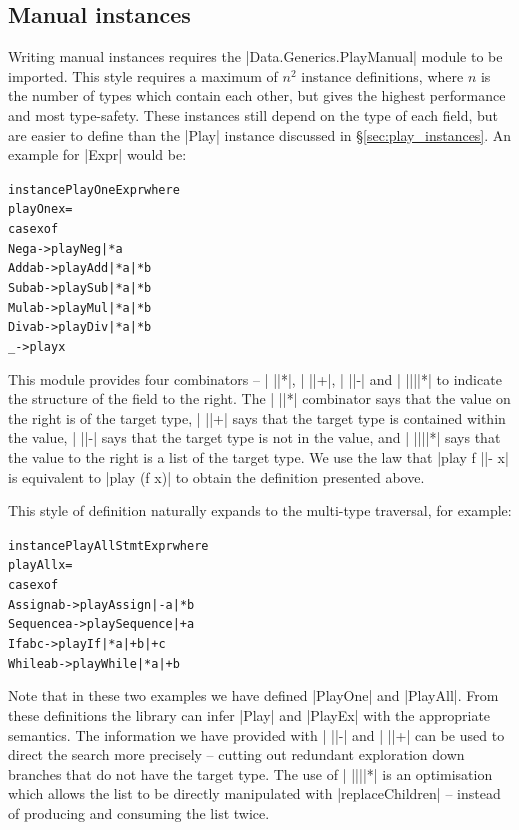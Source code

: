 \documentclass[preprint]{sigplanconf}
\newenvironment{code}{\begin{alltt}\small}{\end{alltt}}
\begin{document}
\subsection{Manual instances}

Writing manual instances requires the |Data.Generics.PlayManual| module to be imported. This style requires a maximum of $n^2$ instance definitions, where $n$ is the number of types which contain each other, but gives the highest performance and most type-safety. These instances still depend on the type of each field, but are easier to define than the |Play| instance discussed in \S\ref{sec:play_instances}. An example for |Expr| would be:

\begin{code}
instance PlayOne Expr where
    playOne x =
        case x of
            Neg  a    -> play Neg  |* a
            Add  a b  -> play Add  |* a |* b
            Sub  a b  -> play Sub  |* a |* b
            Mul  a b  -> play Mul  |* a |* b
            Div  a b  -> play Div  |* a |* b
            _         -> play x
\end{code}

This module provides four combinators -- | ||*|, | ||+|, | ||-| and | ||||*| to indicate the structure of the field to the right. The | ||*| combinator says that the value on the right is of the target type, | ||+| says that the target type is contained within the value, | ||-| says that the target type is not in the value, and | ||||*| says that the value to the right is a list of the target type. We use the law that |play f ||- x| is equivalent to |play (f x)| to obtain the definition presented above.

This style of definition naturally expands to the multi-type traversal, for example:

\begin{code}
instance PlayAll Stmt Expr where
    playAll x =
        case x of
            Assign    a b    -> play Assign    |-  a |*  b
            Sequence  a      -> play Sequence  |+  a
            If        a b c  -> play If        |*  a |+  b |+ c
            While     a b    -> play While     |*  a |+  b
\end{code}

Note that in these two examples we have defined |PlayOne| and |PlayAll|. From these definitions the library can infer |Play| and |PlayEx| with the appropriate semantics. The information we have provided with | ||-| and | ||+| can be used to direct the search more precisely -- cutting out redundant exploration down branches that do not have the target type. The use of | ||||*| is an optimisation which allows the list to be directly manipulated with |replaceChildren| -- instead of producing and consuming the list twice.
\end{document}
